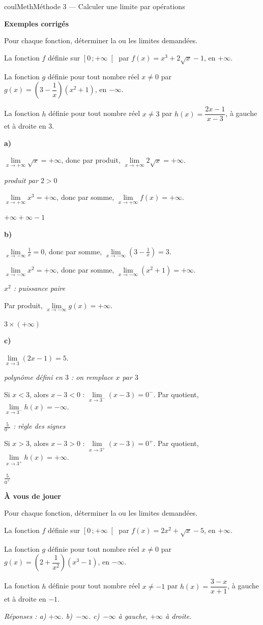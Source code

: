 \documentclass[11pt,a4paper]{article}
\makeatletter
\newcommand{\lycee@intfo}[2]{\left[#1\,;#2\right[}
\providecommand{\intfo}{\lycee@intfo}%
\newcounter{lycee@signet}
\newcommand{\signet}[3][]{\stepcounter{lycee@signet}%
  \edef\lycee@dest{\if\relax\detokenize{#1}\relax
    signet.\arabic{lycee@signet}\else#1\fi}%
  \hypertarget{\lycee@dest}{}\bookmark[level=#2,dest=\lycee@dest]{#3}}
\newcommand{\res}[1]{#1}
\newcounter{methode}
\newenvironment{methodebox}[1][Méthode]{\stepcounter{methode}%
  \begin{boitecours}[phantom={\signet[methode-\arabic{methode}]{2}{#1}}]{coulMeth}{#1}}%
  {\end{boitecours}}
\newcommand{\etape}[1]{\par\smallskip\textbf{\color{coulMeth}#1}\par\nobreak\smallskip}
\newcommand{\reponse}[1]{\par\smallskip
  {\footnotesize\itshape\color{black!55}Réponses : #1}}
\newcommand{\explique}[2]{\par\smallskip\noindent
  \begin{minipage}[t]{0.57\linewidth}\raggedright #1\end{minipage}\hfill
  \begin{minipage}[t]{0.40\linewidth}\raggedright\leavevmode
    {\small\itshape\color{black!60}#2}\end{minipage}\par}
\newcommand{\cas}[1]{\par\smallskip\noindent\textbf{\color{coulExo}#1}\vadjust{\nobreak}}
\newenvironment{correction}{\par}{\par}
\newcommand{\etapeexemples}{\etape{Exemples corrigés}}
\makeatother
\begin{document}
\begin{methodebox}[Méthode 3 --- Calculer une limite par opérations]
\etapeexemples
Pour chaque fonction, déterminer la ou les limites demandées.
\begin{questions}[label=\alph*)]
  \item La fonction $f$ définie sur $\intfo{0}{+\infty}$ par $f(x)=x^{3}+2\sqrt{x}-1$, en
        $+\infty$.
  \item La fonction $g$ définie pour tout nombre réel $x\neq 0$ par
        $g(x)=\left(3-\dfrac{1}{x}\right)\left(x^{2}+1\right)$, en $-\infty$.
  \item La fonction $h$ définie pour tout nombre réel $x\neq 3$ par
        $h(x)=\dfrac{2x-1}{x-3}$, à gauche et à droite en $3$.
\end{questions}
\begin{correction}
\cas{a)}
\explique{$\lim\limits_{x\to+\infty}\sqrt{x}=+\infty$, donc par produit,
$\lim\limits_{x\to+\infty}2\sqrt{x}=+\infty$.}{produit par $2>0$}
\explique{$\lim\limits_{x\to+\infty}x^{3}=+\infty$, donc par somme,
\res{$\lim\limits_{x\to+\infty}f(x)=+\infty$}.}{$+\infty+\infty-1$}
\cas{b)}
\explique{$\lim\limits_{x\to-\infty}\frac{1}{x}=0$, donc par somme,
$\lim\limits_{x\to-\infty}\left(3-\frac{1}{x}\right)=3$.}{}
\explique{$\lim\limits_{x\to-\infty}x^{2}=+\infty$, donc par somme,
$\lim\limits_{x\to-\infty}\left(x^{2}+1\right)=+\infty$.}{$x^{2}$ : puissance paire}
\explique{Par produit, \res{$\lim\limits_{x\to-\infty}g(x)=+\infty$}.}{$3\times(+\infty)$}
\cas{c)}
\explique{$\lim\limits_{x\to 3}(2x-1)=5$.}{polynôme défini en $3$ : on remplace $x$
par $3$}
\explique{Si $x<3$, alors $x-3<0$ : $\lim\limits_{x\to 3^{-}}(x-3)=0^{-}$. Par quotient,
\res{$\lim\limits_{x\to 3^{-}}h(x)=-\infty$}.}{$\frac{5}{0^{-}}$ : règle des signes}
\explique{Si $x>3$, alors $x-3>0$ : $\lim\limits_{x\to 3^{+}}(x-3)=0^{+}$. Par quotient,
\res{$\lim\limits_{x\to 3^{+}}h(x)=+\infty$}.}{$\frac{5}{0^{+}}$}
\end{correction}

\etape{À vous de jouer}
Pour chaque fonction, déterminer la ou les limites demandées.
\begin{questions}[label=\alph*)]
  \item La fonction $f$ définie sur $\intfo{0}{+\infty}$ par $f(x)=2x^{2}+\sqrt{x}-5$, en
        $+\infty$.
  \item La fonction $g$ définie pour tout nombre réel $x\neq 0$ par
        $g(x)=\left(2+\dfrac{1}{x^{2}}\right)\left(x^{3}-1\right)$, en $-\infty$.
  \item La fonction $h$ définie pour tout nombre réel $x\neq -1$ par
        $h(x)=\dfrac{3-x}{x+1}$, à gauche et à droite en $-1$.
\end{questions}
\reponse{a) $+\infty$.\; b)~$-\infty$.\; c)~$-\infty$ à gauche, $+\infty$ à droite.}
\end{methodebox}
\end{document}
